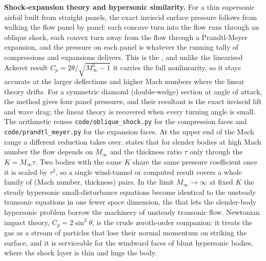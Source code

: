 \begin{mastery}
\textbf{Shock-expansion theory and hypersonic similarity.} For a thin
supersonic airfoil built from straight panels, the exact inviscid
surface pressure follows from walking the flow panel by panel: each
concave turn into the flow runs through an oblique shock, each convex
turn away from the flow through a Prandtl-Meyer expansion, and the
pressure on each panel is whatever the running tally of compressions
and expansions delivers. This is the ,
and unlike the linearised Ackeret result $C_p = 2\theta/\sqrt{M_\infty^2
- 1}$ it carries the full nonlinearity, so it stays accurate at the
larger deflections and higher Mach numbers where the linear theory
drifts. For a symmetric diamond (double-wedge) section at angle of
attack, the method gives four panel pressures, and their resultant is
the exact inviscid lift and wave drag; the linear theory is recovered
when every turning angle is small. The arithmetic reuses
\texttt{code/oblique\_shock.py} for the compression faces and
\texttt{code/prandtl\_meyer.py} for the expansion faces. At the upper
end of the Mach range a different reduction takes over.
 states that for slender bodies at high
Mach number the flow depends on $M_\infty$ and the thickness ratio
$\tau$ only through the 
$K = M_\infty \tau$. Two bodies with the same $K$ share the same
pressure coefficient once it is scaled by $\tau^2$, so a single
wind-tunnel or computed result covers a whole family of (Mach number,
thickness) pairs. In the limit $M_\infty \to \infty$ at fixed $K$ the
steady hypersonic small-disturbance equations become identical to the
unsteady transonic equations in one fewer space dimension, the
 that lets the slender-body hypersonic
problem borrow the machinery of unsteady transonic flow. Newtonian
impact theory, $C_p = 2\sin^2\theta$, is the crude zeroth-order
companion: it treats the gas as a stream of particles that lose their
normal momentum on striking the surface, and it is serviceable for the
windward faces of blunt hypersonic bodies, where the shock layer is
thin and hugs the body.
\end{mastery}


